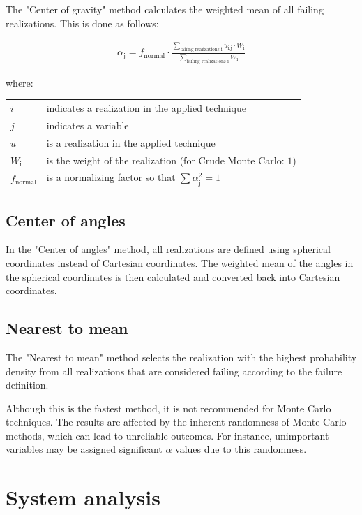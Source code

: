 {The "Center of gravity" method calculates the weighted mean of all failing realizations. This is done as follows:

\begin{align}
\label{eq:CenterOfGravity}
\alpha_{\text{j}} =  f_{\text{normal}} \cdot \frac{\sum_{\text{failing realizations i}} u_{\text{i,j}} \cdot W_{\text{i}}}{\sum_{\text{failing realizations i}} W_{\text{i}}} 
\end{align}

where:
\begin{longtable*}{p{20mm}p{\textwidth-24pt-20mm}}  
	$i$ & indicates a realization in the applied technique \\
	$j$ & indicates a variable \\
	$u$ & is a realization in the applied technique \\
	$W_{\text{i}}$ & is the weight of the realization (for Crude Monte Carlo: $1$) \\
	$f_{\text{normal}}$ & is a normalizing factor so that $\sum \alpha^2_{\text{j}} = 1$
\end{longtable*}

\subsection{Center of angles}
\label{sec:CenterOfAngles}

In the "Center of angles" method, all realizations are defined using spherical coordinates instead of Cartesian coordinates. The weighted mean of the angles in the spherical coordinates is then calculated and converted back into Cartesian coordinates.

\subsection{Nearest to mean}
\label{sec:NearestToMean}

The "Nearest to mean" method selects the realization with the highest probability density from all realizations that are considered failing according to the failure definition.

Although this is the fastest method, it is not recommended for Monte Carlo techniques. The results are affected by the inherent randomness of Monte Carlo methods, which can lead to unreliable outcomes. For instance, unimportant variables may be assigned significant $\alpha$ values due to this randomness.


\section{System analysis}
\label{sec:SystemAnalysis}

}
